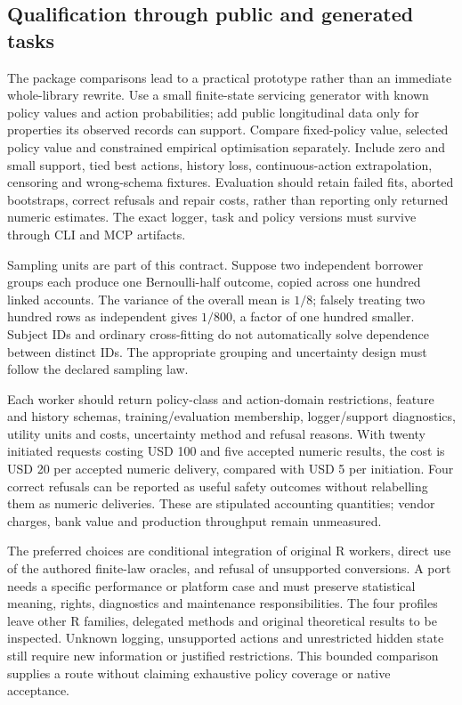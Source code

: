 \subsection{Qualification through public and generated tasks}
The package comparisons lead to a practical prototype rather than an immediate
whole-library rewrite. Use a small finite-state servicing generator with known
policy values and action probabilities; add public longitudinal data only for
properties its observed records can support. Compare fixed-policy value, selected
policy value and constrained empirical optimisation separately. Include zero and
small support, tied best actions, history loss, continuous-action extrapolation,
censoring and wrong-schema fixtures. Evaluation should retain failed fits,
aborted bootstraps, correct refusals and repair costs, rather than reporting only
returned numeric estimates. The exact logger, task and policy versions must survive
through CLI and MCP artifacts.

Sampling units are part of this contract. Suppose two independent borrower groups
each produce one Bernoulli-half outcome, copied across one hundred linked accounts.
The variance of the overall mean is $1/8$; falsely treating two hundred rows as
independent gives $1/800$, a factor of one hundred smaller. Subject IDs and ordinary
cross-fitting do not automatically solve dependence between distinct IDs. The
appropriate grouping and uncertainty design must follow the declared sampling law.
\citep{exec24_policiesr_reference}

Each worker should return policy-class and action-domain restrictions, feature and
history schemas, training/evaluation membership, logger/support diagnostics, utility
units and costs, uncertainty method and refusal reasons. With twenty initiated
requests costing USD 100 and five accepted numeric results, the cost is USD 20 per
accepted numeric delivery, compared with USD 5 per initiation. Four correct refusals
can be reported as useful safety outcomes without relabelling them as numeric
deliveries. These are stipulated accounting quantities; vendor charges, bank value
and production throughput remain unmeasured.\citep{exec24_policiesr_reference}

The preferred choices are conditional integration of original R workers, direct use
of the authored finite-law oracles, and refusal of unsupported conversions. A port
needs a specific performance or platform case and must preserve statistical meaning,
rights, diagnostics and maintenance responsibilities. The four profiles leave other
R families, delegated methods and original theoretical results to be inspected.
Unknown logging, unsupported actions and unrestricted hidden state still require
new information or justified restrictions. This bounded comparison supplies a route
without claiming exhaustive policy coverage or native acceptance.
